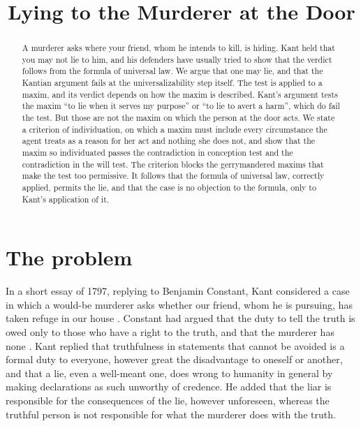 \documentclass{situationist-preprint}
\title{Lying to the Murderer at the Door}
\begin{document}
\maketitle

\begin{abstract}
A murderer asks where your friend, whom he intends to kill, is hiding. Kant held that you may not lie to him, and his defenders have usually tried to show that the verdict follows from the formula of universal law. We argue that one may lie, and that the Kantian argument fails at the universalizability step itself. The test is applied to a maxim, and its verdict depends on how the maxim is described. Kant's argument tests the maxim \enquote{to lie when it serves my purpose} or \enquote{to lie to avert a harm}, which do fail the test. But those are not the maxim on which the person at the door acts. We state a criterion of individuation, on which a maxim must include every circumstance the agent treats as a reason for her act and nothing she does not, and show that the maxim so individuated passes the contradiction in conception test and the contradiction in the will test. The criterion blocks the gerrymandered maxims that make the test too permissive. It follows that the formula of universal law, correctly applied, permits the lie, and that the case is no objection to the formula, only to Kant's application of it.
\end{abstract}

\section{The problem}

In a short essay of 1797, replying to Benjamin Constant, Kant considered a case in which a would-be murderer asks whether our friend, whom he is pursuing, has taken refuge in our house \citep{Kant1797}. Constant had argued that the duty to tell the truth is owed only to those who have a right to the truth, and that the murderer has none \citep{Constant1797}. Kant replied that truthfulness in statements that cannot be avoided is a formal duty to everyone, however great the disadvantage to oneself or another, and that a lie, even a well-meant one, does wrong to humanity in general by making declarations as such unworthy of credence. He added that the liar is responsible for the consequences of the lie, however unforeseen, whereas the truthful person is not responsible for what the murderer does with the truth.
\end{document}

